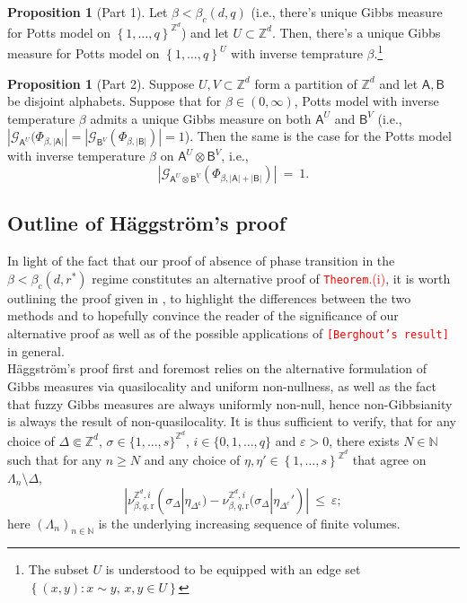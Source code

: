 \documentclass[12pt]{article}
\renewcommand{\AA}{\mathsf{A}}
\newcommand{\AB}{\mathsf{B}}
\newcommand{\G}{\mathcal{G}}
\newcommand{\N}{\mathbb{N}}
\renewcommand{\r}{\mathrm{r}}
\newcommand{\Z}{\mathbb{Z}}
\newcommand{\set}[1]{\left\{#1\right\}}
\newcommand{\1}{\mathbbm{1}}
\renewcommand{\c}{\mathsf{c}}
\newcommand{\5}{\vspace{0.5cm}}
\theoremstyle{definition}
\newtheorem{prop}[thm]{Proposition}
\begin{document}
\begin{prop}[Part 1]
Let $\beta<\beta_c(d,q)$ (i.e., there's unique Gibbs measure for Potts model on $\set{1,\ldots,q}^{\Z^d}$) and let $U\subset\Z^d$. Then, there's a unique Gibbs measure for Potts model on $\set{1,\ldots,q}^U$ with inverse temprature $\beta$.\footnote{The subset $U$ is understood to be equipped with an edge set $\set{(x,y):x\sim y,\,x,y\in U}$}
\end{prop}

\begin{prop}[Part 2]
Suppose $U,V\subset\Z^d$ form a partition of $\Z^d$ and let $\AA,\AB$ be disjoint alphabets. Suppose that for $\beta\in(0,\infty)$, Potts model with inverse temperature $\beta$ admits a unique Gibbs measure on both $\AA^U$ and $\AB^V$ (i.e., $|\G_{\AA^U}(\Phi_{\beta,|\AA|}|=|\G_{\AB^V}(\Phi_{\beta,|\AB|})|=1$). Then the same is the case for the Potts model with inverse temperature $\beta$ on $\AA^U\otimes\AB^V$, i.e.,
$$|\G_{\AA^U\otimes\AB^V}(\Phi_{\beta,|\AA|+|\AB|})| ~=~ 1.$$
\end{prop}

\subsection{Outline of H\"aggstr\"om's proof}

In light of the fact that our proof of absence of phase transition in the $\beta<\beta_c(d,r^*)$ regime constitutes an alternative proof of \textcolor{red}{\texttt{Theorem}.(i)}, it is worth outlining the proof given in \cite{Hag}, to highlight the differences between the two methods and to hopefully convince the reader of the significance of our alternative proof as well as of the possible applications of \textcolor{red}{\texttt{[Berghout's result]}} in general. \\

H\"aggstr\"om's proof first and foremost relies on the alternative formulation of Gibbs measures via quasilocality and uniform non-nullness, as well as the fact that fuzzy Gibbs measures are always uniformly non-null, hence non-Gibbsianity is always the result of non-quasilocality. It is thus sufficient to verify, that for any choice of $\Delta\Subset\Z^d$, $\sigma\in\{1,\ldots,s\}^{\Z^d}$, $i\in\{0,1,\ldots,q\}$ and $\varepsilon>0$, there exists $N\in\N$ such that for any $n\geq N$ and any choice of $\eta,\eta'\in\set{1,\ldots,s}^{\Z^d}$ that agree on $\Lambda_n\setminus\Delta$,
$$|\nu_{\beta,q,\r}^{\Z^d,i}(\sigma_{\Delta}|\eta_{\Delta^\c})-\nu_{\beta,q,\r}^{\Z^d,i}(\sigma_\Delta|\eta_{\Delta^c}')| ~\leq~ \varepsilon;$$
here $(\Lambda_n)_{n\in\N}$ is the underlying increasing sequence of finite volumes. \\
\end{document}
